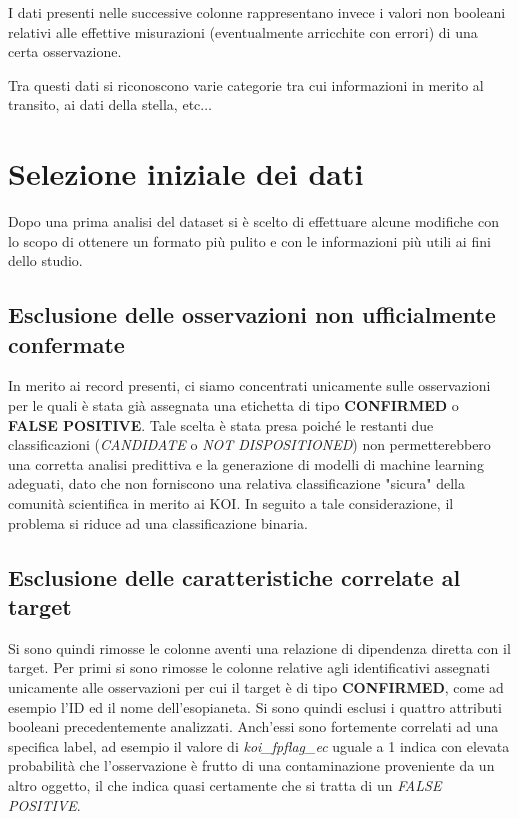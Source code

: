 I dati presenti nelle successive colonne rappresentano invece i valori non 
booleani relativi alle effettive misurazioni (eventualmente arricchite con 
errori) di una certa osservazione. 

Tra questi dati si riconoscono varie categorie tra cui informazioni in merito al 
transito, ai dati della stella, etc$\ldots$

\section{Selezione iniziale dei dati}
Dopo una prima analisi del dataset si è scelto di effettuare alcune modifiche
con lo scopo di ottenere un formato più pulito e con le informazioni più utili 
ai fini dello studio.

\subsection{Esclusione delle osservazioni non ufficialmente confermate}
In merito ai record presenti, ci siamo concentrati unicamente sulle osservazioni per le quali 
è stata già assegnata una etichetta di tipo \textbf{CONFIRMED} o \textbf{FALSE POSITIVE}.
Tale scelta è stata presa poiché le restanti due classificazioni (\textit{CANDIDATE} o 
\textit{NOT DISPOSITIONED}) non permetterebbero una corretta analisi predittiva e la generazione
di modelli di machine learning adeguati, dato che non forniscono una relativa classificazione 
"sicura" della comunità scientifica in merito ai KOI. 
In seguito a tale considerazione, il problema si riduce ad una classificazione binaria.


\subsection{Esclusione delle caratteristiche correlate al target}
Si sono quindi rimosse le colonne aventi una relazione di dipendenza diretta
con il target. 
Per primi si sono rimosse le colonne relative agli identificativi assegnati 
unicamente alle osservazioni per cui il target è di tipo \textbf{CONFIRMED}, come ad
esempio l'ID ed il nome dell'esopianeta.
Si sono quindi esclusi i quattro attributi booleani precedentemente 
analizzati. Anch'essi sono fortemente correlati ad una specifica 
label, ad esempio il valore di \textit{koi\_fpflag\_ec} uguale a 1 indica con elevata 
probabilità che l'osservazione è frutto di una contaminazione proveniente da un altro oggetto,
il che indica quasi certamente che si tratta di un \textit{FALSE POSITIVE}.


